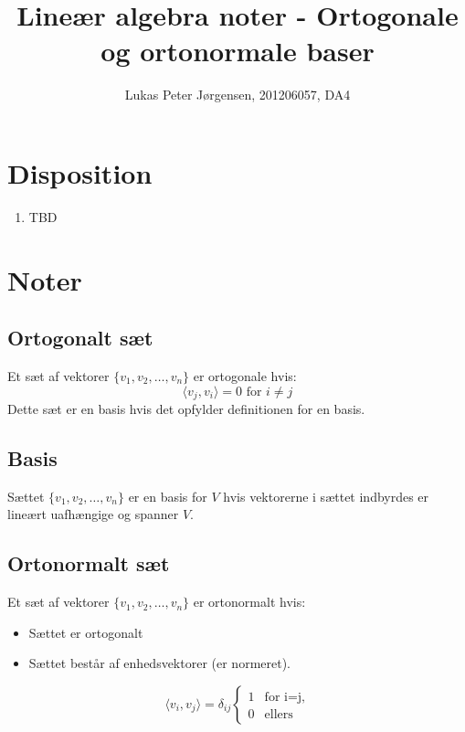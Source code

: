 \documentclass[a4paper,oneside,article]{memoir}
\newcommand{\inner}[2]{\langle #1,#2 \rangle}
\begin{document}
    \title{Lineær algebra noter - Ortogonale og ortonormale baser}
    \author{Lukas Peter Jørgensen, 201206057, DA4
            }
    \maketitle
    
    \tableofcontents
        
    \chapter{Disposition}
    \begin{enumerate}
    \item TBD
    \end{enumerate}
    
	\chapter{Noter}
	
	\section{Ortogonalt sæt}
	Et sæt af vektorer $\{v_1,v_2,\dots,v_n\}$ er ortogonale hvis:
	$$\inner{v_j}{v_i}=0 \text{ for } i\neq j$$
	Dette sæt er en basis hvis det opfylder definitionen for en
	basis.
	
	\section{Basis}
	Sættet $\{v_1,v_2,\dots,v_n\}$ er en basis for $V$ hvis 
	vektorerne i sættet indbyrdes er lineært uafhængige og spanner
	$V$.
	
	\section{Ortonormalt sæt}
	Et sæt af vektorer $\{v_1,v_2,\dots,v_n\}$ er ortonormalt hvis:
	\begin{itemize}
	\item Sættet er ortogonalt
	\item Sættet består af enhedsvektorer (er normeret).
	\end{itemize}
	$$\inner{v_i}{v_j} = \delta_{ij} \left\{ \begin{array}{ll}
		         1 & \mbox{for i=j},\\
		        0 & \mbox{ellers}\end{array} \right.$$
		        
\end{document}
